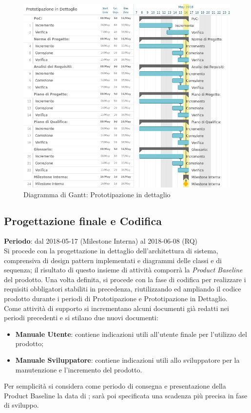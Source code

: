 \begin{figure}[h!]
	\centerline{\includegraphics[scale=0.55]{img/DiagrammiGantt/PrototipazioneDettaglio.jpg}}
	\caption{Diagramma di Gantt: Prototipazione in dettaglio}
	\label{fig:gantt_prot_dett}
\end{figure}
\clearpage

\subsection{Progettazione finale e Codifica}
\textbf{Periodo}: dal 2018-05-17 (Milestone Interna) al 2018-06-08 (RQ)\\

Si procede con la progettazione in dettaglio dell'architettura di sistema, comprensiva di design pattern implementati e diagrammi delle classi e di sequenza; il risultato di questo insieme di attività comporrà la \emph{Product Baseline} del prodotto. Una volta definita, si procede con la fase di codifica per realizzare i requisiti obbligatori stabiliti in precedenza, riutilizzando ed ampliando il codice prodotto durante i periodi di Prototipazione e Prototipazione in Dettaglio. \\
Come attività di supporto si incrementano alcuni documenti già redatti nei periodi precedenti e si stilano due nuovi documenti:
\begin{itemize}
	\item \textbf{Manuale Utente}: contiene indicazioni utili all'utente finale per l'utilizzo del prodotto;
	\item \textbf{Manuale Sviluppatore}: contiene indicazioni utili allo sviluppatore per la manutenzione e l'incremento del prodotto.
\end{itemize}
Per semplicità si considera come periodo di consegna e presentazione della Product Baseline la data di \RQ{}; sarà poi specificata una scadenza più precisa in fase di sviluppo.

